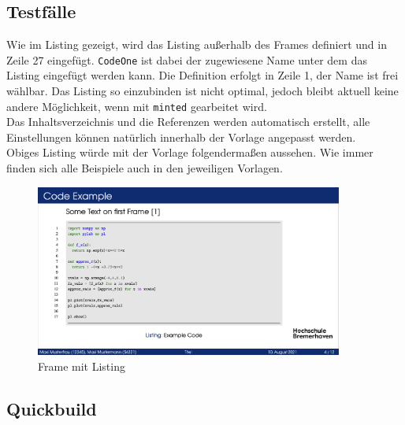 \subsection{Testfälle}


Wie im Listing gezeigt, wird das Listing außerhalb des Frames definiert und
in Zeile 27 eingefügt. \texttt{CodeOne} ist dabei der zugewiesene Name unter dem
das Listing eingefügt werden kann. Die Definition erfolgt in Zeile 1, der Name ist frei wählbar. 
Das Listing so einzubinden ist nicht optimal, jedoch bleibt aktuell keine andere Möglichkeit, wenn mit \texttt{minted} gearbeitet wird.\\
Das Inhaltsverzeichnis und die Referenzen werden automatisch erstellt, alle Einstellungen können natürlich 
innerhalb der Vorlage angepasst werden.\\
Obiges Listing würde mit der Vorlage folgendermaßen aussehen. Wie immer finden sich alle 
Beispiele auch in den jeweiligen Vorlagen.

\FloatBarrier
\begin{figure}[ht!]
	\centering
	\includegraphics[width=0.9\textwidth]{src/abbildungen/beamer_frame.png}
	\caption{Frame mit Listing}
\end{figure}
\FloatBarrier


\newpage

\subsection{Quickbuild}

